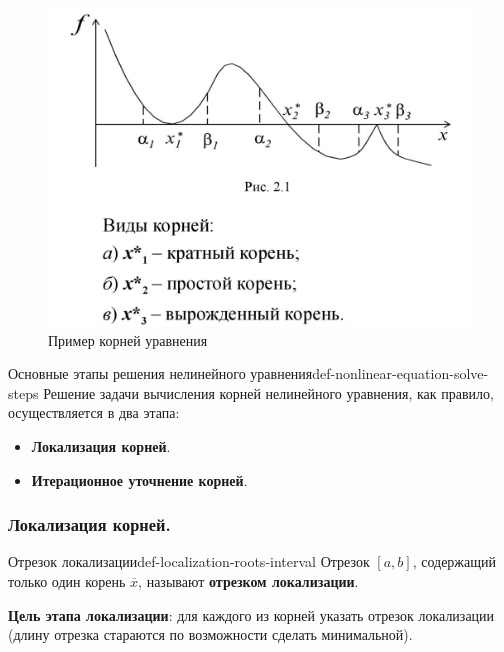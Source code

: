 \documentclass[14pt]{extarticle}
\begin{document}
        \begin{figure}[H]
            \centering
            \includegraphics[scale=0.7]{images/roots-ex.png}
            \caption{Пример корней уравнения}
            \label{fig:roots-example}
        \end{figure}

    \begin{definition}{Основные этапы решения нелинейного уравнения}{def-nonlinear-equation-solve-steps}
        Решение задачи вычисления корней нелинейного уравнения, как правило, осуществляется в два этапа:
        \begin{itemize}
            \item \textbf{Локализация корней}.
            \item \textbf{Итерационное уточнение корней}.
        \end{itemize}
    \end{definition}

    \subsubsection{Локализация корней.}

        \begin{definition}{Отрезок локализации}{def-localization-roots-interval}
            Отрезок $[a, b]$, содержащий только один корень $\overline{x}$, называют \textbf{отрезком локализации}. 
        \end{definition}

        \textbf{Цель этапа локализации}: для каждого из корней указать отрезок локализации (длину отрезка стараются по возможности сделать минимальной).
        
\end{document}
